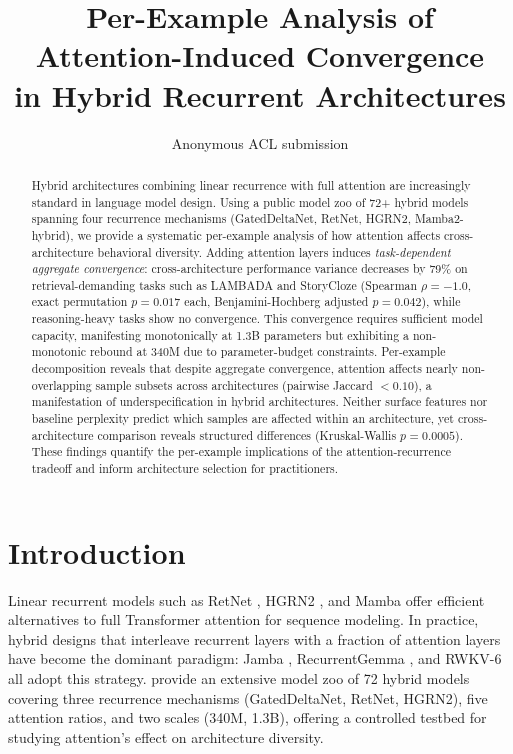 \documentclass[11pt]{article}
\title{Per-Example Analysis of Attention-Induced Convergence\\in Hybrid Recurrent Architectures}
\author{Anonymous ACL submission}
\begin{document}
\maketitle

\begin{abstract}
Hybrid architectures combining linear recurrence with full attention are increasingly standard in language model design.
Using a public model zoo of 72+ hybrid models spanning four recurrence mechanisms (GatedDeltaNet, RetNet, HGRN2, Mamba2-hybrid), we provide a systematic per-example analysis of how attention affects cross-architecture behavioral diversity.
Adding attention layers induces \textit{task-dependent aggregate convergence}: cross-architecture performance variance decreases by 79\% on retrieval-demanding tasks such as LAMBADA and StoryCloze (Spearman $\rho = {-}1.0$, exact permutation $p = 0.017$ each, Benjamini-Hochberg adjusted $p = 0.042$), while reasoning-heavy tasks show no convergence.
This convergence requires sufficient model capacity, manifesting monotonically at 1.3B parameters but exhibiting a non-monotonic rebound at 340M due to parameter-budget constraints.
Per-example decomposition reveals that despite aggregate convergence, attention affects nearly non-overlapping sample subsets across architectures (pairwise Jaccard $< 0.10$), a manifestation of underspecification in hybrid architectures.
Neither surface features nor baseline perplexity predict which samples are affected within an architecture, yet cross-architecture comparison reveals structured differences (Kruskal-Wallis $p = 0.0005$).
These findings quantify the per-example implications of the attention-recurrence tradeoff and inform architecture selection for practitioners.
\end{abstract}

\section{Introduction}

Linear recurrent models such as RetNet \citep{sun2023retnet}, HGRN2 \citep{qin2024hgrn2}, and Mamba \citep{gu2023mamba} offer efficient alternatives to full Transformer attention for sequence modeling.
In practice, hybrid designs that interleave recurrent layers with a fraction of attention layers have become the dominant paradigm: Jamba \citep{lieber2024jamba}, RecurrentGemma \citep{botev2024recurrentgemma}, and RWKV-6 \citep{peng2024rwkv} all adopt this strategy.
\citet{wang2025zoo} provide an extensive model zoo of 72 hybrid models covering three recurrence mechanisms (GatedDeltaNet, RetNet, HGRN2), five attention ratios, and two scales (340M, 1.3B), offering a controlled testbed for studying attention's effect on architecture diversity.
\end{document}

